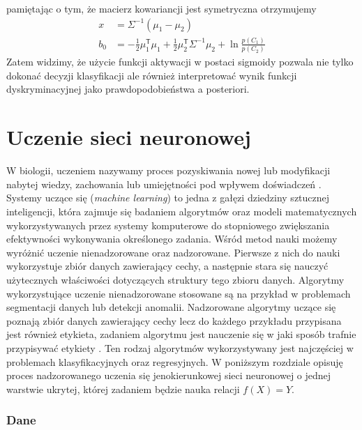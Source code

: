 \documentclass[11pt]{book}
\theoremstyle{definition}
\begin{document}
%
pamiętając o tym, że macierz kowariancji jest symetryczna otrzymujemy
%
\begin{subequations}
	\begin{align}
	x &= \Sigma^{-1} \left(\mu_1 - \mu_2\right)\\
	b_0 &= - \frac{1}{2} \mu_1^\mathsf{T}\mu_1 + \frac{1}{2} \mu_2^\mathsf{T} \Sigma^{-1} \mu_2 + \ln \frac{p(C_1)}{p(C_2)}
	\end{align}
\end{subequations}
%
Zatem widzimy, że użycie funkcji aktywacji w postaci sigmoidy pozwala nie tylko dokonać decyzji klasyfikacji ale również interpretować wynik funkcji dyskryminacyjnej jako prawdopodobieństwa a posteriori.
%


\section{Uczenie sieci neuronowej}
\label{backprop}

W biologii, uczeniem nazywamy proces pozyskiwania nowej lub modyfikacji nabytej wiedzy, zachowania lub umiejętności pod wpływem doświadczeń \cite{2008:Biologia}. Systemy uczące się (\textit{machine learning}) to jedna z gałęzi dziedziny sztucznej inteligencji, która zajmuje się badaniem algorytmów oraz modeli matematycznych wykorzystywanych przez systemy komputerowe do stopniowego zwiększania efektywności wykonywania określonego zadania. Wśród metod nauki możemy wyróżnić uczenie nienadzorowane oraz nadzorowane. Pierwsze z nich do nauki wykorzystuje zbiór danych zawierający cechy, a następnie stara się nauczyć użytecznych właściwości dotyczących struktury tego zbioru danych. Algorytmy wykorzystujące uczenie nienadzorowane stosowane są na przykład w problemach segmentacji danych lub detekcji anomalii. Nadzorowane algorytmy uczące się poznają zbiór danych zawierający cechy lecz do każdego przykładu przypisana jest również etykieta, zadaniem algorytmu jest nauczenie się w jaki sposób trafnie przypisywać etykiety \cite{Goodfellow-et-al-2016}. Ten rodzaj algorytmów wykorzystywany jest najczęściej w problemach klasyfikacyjnych oraz regresyjnych. W poniższym rozdziale opisuję proces nadzorowanego uczenia się jenokierunkowej sieci neuronowej o jednej warstwie ukrytej, której zadaniem będzie nauka relacji $f(X)  = Y$.


\subsubsection{Dane}
\end{document}
